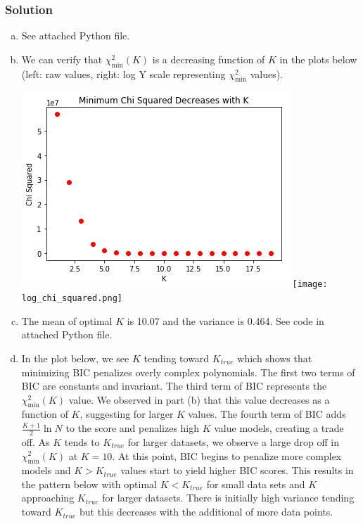 \documentclass[submit]{harvardml}
\begin{document}
\subsubsection*{Solution}
\begin{enumerate}[(a)]

\item See attached Python file.

\item We can verify that $\chi^2_{\min}(K)$ is a decreasing function of $K$ in the plots below (left: raw values, right: log Y scale representing $\chi^2_\min$ values). 

\begin{center}
    \includegraphics[scale = .55]{decreasing_K.png}
    \texttt{[image: log\_chi\_squared.png]}
\end{center}

\item The mean of optimal $K$ is 10.07 and the variance is 0.464. See code in attached Python file.

\item In the plot below, we see $K$ tending toward $K_{true}$ which shows that minimizing BIC penalizes overly complex polynomials. The first two terms of BIC are constants and invariant. The third term of BIC represents the $\chi^2_{\min}(K)$ value. We observed in part (b) that this value decreases as a function of $K$, suggesting for larger $K$ values. The fourth term of BIC adds $\frac{K+1}{2}\ln N$ to the score and penalizes high $K$ value models, creating a trade off. As $K$ tends to $K_{true}$ for larger datasets, we observe a large drop off in $\chi^2_{\min}(K)$ at $K=10$. At this point, BIC begins to penalize more complex models and $K>K_{true}$ values start to yield higher BIC scores. This results in the pattern below with optimal $K < K_{true}$ for small data sets and $K$ approaching $K_{true}$ for larger datasets. There is initially high variance tending toward $K_{true}$ but this decreases with the additional of more data points. 


\end{enumerate}
\end{document}
